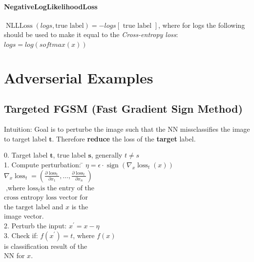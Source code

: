 \documentclass[11pt]{extarticle}
\newcommand\tab[1][0.25cm]{\hspace*{#1}}
\begin{document}
\begin{multicols*}{3}
        \paragraph{NegativeLogLikelihoodLoss} \tab $ \operatorname { NLLLoss } ({logs }, \text {true label} ) = - logs[\text { true label }]$, where for logs the following should be used to make it equal to the \textit{Cross-entropy loss}: $logs=log(softmax(x))$

		\section{Adverserial Examples}
			
			\subsection*{Targeted FGSM (Fast Gradient Sign Method)}
			
			     Intuition: Goal is to perturbe the image such that the NN missclassifies the image to target label $\boldsymbol t$. Therefore \textbf{reduce} the loss of the \textbf{target} label.
			     
			     \begin{tabbing}
			     0. Target label $\boldsymbol t$, true label $\boldsymbol s$, generally $t \neq s$ \\
				 1. Compute perturbation: \hspace{2mm} \= $\eta = \epsilon \cdot \operatorname { sign } \left( \nabla _ { x } \operatorname { loss } _ { t } ( x ) \right)$ \\
				
				\> $\nabla _ { x } \operatorname { loss } _ { t } = \left( \frac { \partial \operatorname { loss } _ { t } } { \partial x _ { 1 } } , \ldots , \frac { \partial \operatorname { loss } _ { t } } { \partial x _ { n } } \right)$ \\
				\> $ \text{,where } \operatorname { loss } _ { t } \text{is the entry of the}$  \\ 
				\> $ \text{cross entropy loss vector for}$  \\
				\> $ \text{the target label}$ and $x$ is the \\
				\> image vector.\\
				
				2. Perturb the input: \> $x ^ { \prime } = x - \eta$ \\
				3. Check if: \> $f \left( x ^ { \prime } \right)= t$, where $f \left( x \right) $ \\
				\> is classification result of the \\
				\> NN for $x$.
			\end{tabbing}
			

\end{multicols*}
\end{document}
